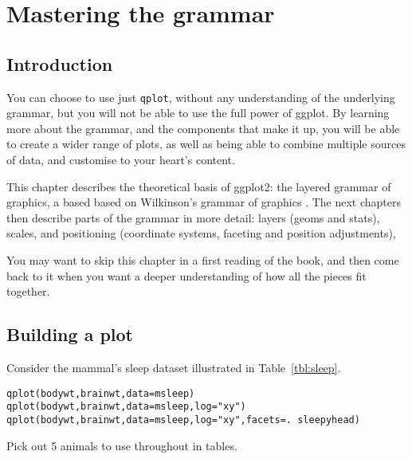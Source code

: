 

\chapter{Mastering the grammar}
\label{cha:mastery}



\section{Introduction}\label{sec:introduction}

You can choose to use just {\tt qplot}, without any understanding of the underlying grammar, but you will not be able to use the full power of ggplot.  By learning more about the grammar, and the components that make it up, you will be able to create a wider range of plots, as well as being able to combine multiple sources of data, and customise to your heart's content.

This chapter describes the theoretical basis of ggplot2: the layered grammar of graphics, a based based on Wilkinson's grammar of graphics \citep{wilkinson:2006}.  The next chapters then describe parts of the grammar in more detail: layers (geoms and stats), scales, and positioning (coordinate systems, faceting and position adjustments),

You may want to skip this chapter in a first reading of the book, and then come back to it when you want a deeper understanding of how all the pieces fit together.

\section{Building a plot}
\label{sec:building_a_plot}

Consider the mammal's sleep dataset illustrated in Table~\ref{tbl:sleep}.

% 

\begin{alltt}
  qplot(bodywt, brainwt, data=msleep)
  qplot(bodywt, brainwt, data=msleep, log="xy")
  qplot(bodywt, brainwt, data=msleep, log="xy", facets = . ~ sleepyhead)
\end{alltt}

Pick out 5 animals to use throughout in tables.

